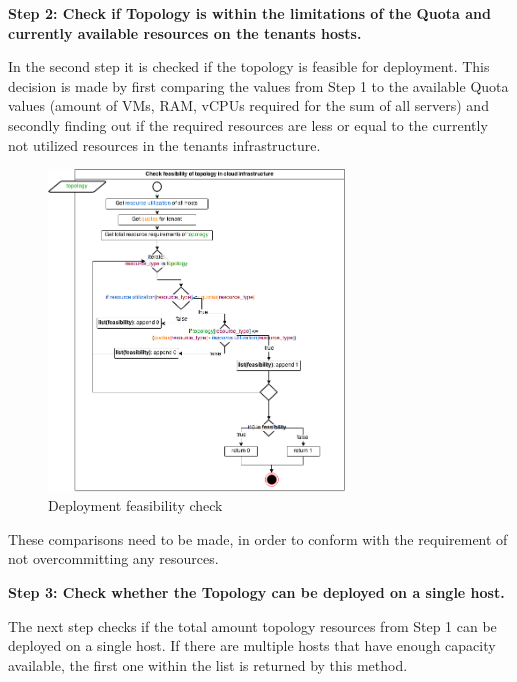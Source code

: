 \textbf{Step 2: Check if Topology is within the limitations of the Quota and currently available resources on the tenants hosts.}

In the second step it is checked if the topology is feasible for deployment. This decision is made by first comparing the values from Step 1 to the available Quota values (amount of VMs, RAM, vCPUs required for the sum of all servers) and secondly finding out if the required resources are less or equal to the currently not utilized resources in the tenants infrastructure.

\begin{figure}[H]
\centering

\includegraphics[width=0.7\textwidth]{images/design/cm_feasibility_check}

\caption{Deployment feasibility check}
\end{figure}

These comparisons need to be made, in order to conform with the requirement of not overcommitting any resources.


\textbf{Step 3: Check whether the Topology can be deployed on a single host.}

The next step checks if the total amount topology resources from Step 1 can be deployed on a single host. If there are multiple hosts that have enough capacity available, the first one within the list is returned by this method.

